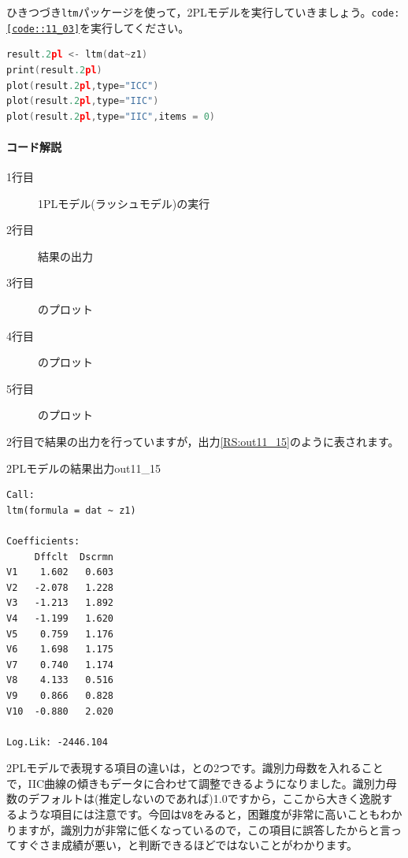\documentclass{ltjsbook}
\begin{document}
ひきつづき\texttt{ltm}パッケージを使って，2PLモデルを実行していきましょう。\texttt{code:\ref{code::11_03}}を実行してください。

\begin{lstlisting}[language=c++,label={code::11_03},caption={2PLモデルの実行}]
result.2pl <- ltm(dat~z1)
print(result.2pl)
plot(result.2pl,type="ICC")
plot(result.2pl,type="IIC")
plot(result.2pl,type="IIC",items = 0)
\end{lstlisting}
        
\paragraph{コード解説}
\begin{description}
        \item[1行目] 1PLモデル(ラッシュモデル)の実行
        \item[2行目] 結果の出力
        \item[3行目] のプロット
        \item[4行目] のプロット
        \item[5行目] のプロット
\end{description}

2行目で結果の出力を行っていますが，出力\ref{RS:out11_15}のように表されます。
\begin{Rscreen}{2PLモデルの結果出力}{out11_15}
    \begin{verbatim}
Call:
ltm(formula = dat ~ z1)

Coefficients:
     Dffclt  Dscrmn
V1    1.602   0.603
V2   -2.078   1.228
V3   -1.213   1.892
V4   -1.199   1.620
V5    0.759   1.176
V6    1.698   1.175
V7    0.740   1.174
V8    4.133   0.516
V9    0.866   0.828
V10  -0.880   2.020

Log.Lik: -2446.104
    \end{verbatim}
\end{Rscreen}

2PLモデルで表現する項目の違いは，との2つです。識別力母数を入れることで，IIC曲線の傾きもデータに合わせて調整できるようになりました。識別力母数のデフォルトは(推定しないのであれば)1.0ですから，ここから大きく逸脱するような項目には注意です。今回は\texttt{V8}をみると，困難度が非常に高いこともわかりますが，識別力が非常に低くなっているので，この項目に誤答したからと言ってすぐさま成績が悪い，と判断できるほどではないことがわかります。
\end{document}
